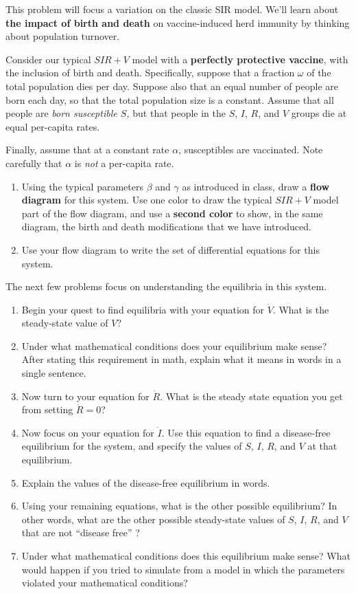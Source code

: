 \documentclass[11pt,onecolumn,superscriptaddress,notitlepage]{article}
\begin{document}
This problem will focus a variation on the classic SIR model. We'll learn about {\bf the impact of birth and death} on vaccine-induced herd immunity by thinking about population turnover. 

Consider our typical $SIR+V$ model with a {\bf perfectly protective vaccine}, with the inclusion of birth and death. Specifically, suppose that a fraction $\omega$ of the total population dies per day. Suppose also that an equal number of people are born each day, so that the total population size is a constant. Assume that all people are {\it born susceptible $S$,} but that people in the $S$, $I$, $R$, and $V$ groups die at equal per-capita rates.

Finally, assume that at a constant rate $\alpha$, susceptibles are vaccinated. Note carefully that $\alpha$ is {\it not} a per-capita rate. 

\begin{enumerate}[resume]
	\item Using the typical parameters $\beta$ and $\gamma$ as introduced in class, draw a {\bf flow diagram} for this system. Use one color to draw the typical $SIR+V$ model part of the flow diagram, and use a {\bf second color} to show, in the same diagram, the birth and death modifications that we have introduced.
	\item Use your flow diagram to write the set of differential equations for this system.
\end{enumerate}	

The next few problems focus on understanding the equilibria in this system.
\begin{enumerate}[resume]	
	\item Begin your quest to find equilibria with your equation for $\dot{V}$. What is the steady-state value of $V$?
	\item Under what mathematical conditions does your equilibrium make sense? After stating this requirement in math, explain what it means in words in a single sentence. 
	\item Now turn to your equation for $\dot{R}$. What is the steady state equation you get from setting $\dot{R}=0$?
	\item Now focus on your equation for $\dot{I}$. Use this equation to find a disease-free equilibrium for the system, and specify the values of $S$, $I$, $R$, and $V$ at that equilibrium. 
	\item Explain the values of the disease-free equilibrium in words. 
	\item Using your remaining equations, what is the other possible equilibrium? In other words, what are the other possible steady-state values of $S$, $I$, $R$, and $V$ that are not ``disease free'' ?
	\item Under what mathematical conditions does this equilibrium make sense? What would happen if you tried to simulate from a model in which the parameters violated your mathematical conditions? 
\end{enumerate}
\end{document}
